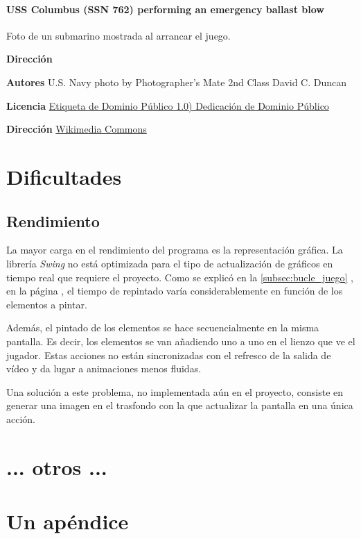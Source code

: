 \documentclass[a4paper,
	11pt,
	parskip=full,
	bibliography=totoc,
	twoside
	]{scrartcl}
\let\oldsection\section
\def\section{\cleardoubleoddpage\oldsection}
\renewcommand{\sectionmark}[1]{\markright{\thesection.\ #1}}
\begin{document}
	\paragraph{USS Columbus (SSN 762) performing an emergency ballast blow}
	Foto de un submarino mostrada al arrancar el juego.
	\begin{labeling}{\textbf{Dirección}}
		\item[\textbf{Autores}] U.S. Navy photo by Photographer's Mate 2nd Class David C. Duncan
		\item[\textbf{Licencia}] \href{https://creativecommons.org/publicdomain/mark/1.0/deed.es_ES}{Etiqueta de Dominio Público 1.0)
			Dedicación de Dominio Público}
		\item[\textbf{Dirección}]\href{https://commons.wikimedia.org/wiki/File:980604-N-7726D-002_Submarine_Emergency_Surfacing_Drill.jpg}{Wikimedia Commons}
	\end{labeling}

\section{Dificultades}
\label{sec:dificultades}
	\subsection{Rendimiento}
	\label{subsec:rendimiento}
		La mayor carga en el rendimiento del programa es la representación gráfica. La librería \textit{Swing} no está optimizada para el tipo de actualización de gráficos en tiempo real que requiere el proyecto. Como se explicó en la \autoref{subsec:bucle_juego} , en la página \pageref{subsec:bucle_juego}, el tiempo de repintado varía considerablemente en función de los elementos a pintar.
		
		Además, el pintado de los elementos se hace secuencialmente en la misma pantalla. Es decir, los elementos se van añadiendo uno a uno en el lienzo que ve el jugador. Estas acciones no están sincronizadas con el refresco de la salida de vídeo y da lugar a animaciones menos fluidas.
		
		Una solución a este problema, no implementada aún en el proyecto, consiste en generar una imagen en el trasfondo con la que actualizar la pantalla en una única acción.

\section{ ... otros ...}

\cleardoubleoddpage
	\renewcommand{\sectionmark}[1]{}
\begin{thebibliography}{9}
	\raggedright
	
\end{thebibliography}
\markright{\appendixname}

\cleardoubleoddpage
\appendix
{}

\section{Un apéndice}
	\FloatBarrier
\end{document}
